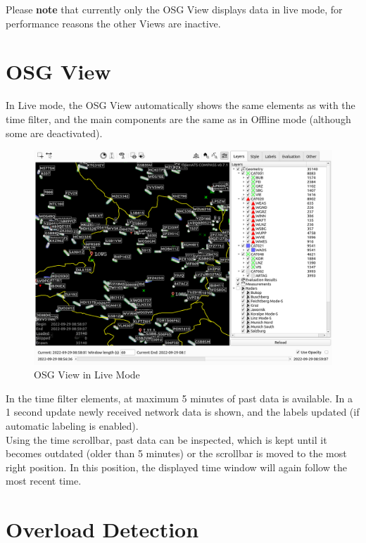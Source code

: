 Please \textbf{note} that currently only the OSG View displays data in live mode, for performance reasons the other Views are inactive.

\section{OSG View}

In Live mode, the OSG View automatically shows the same elements as with the time filter, and the main components are the same as in Offline mode (although some are deactivated).

\begin{figure}[H]
    \hspace*{-2.5cm}
    \includegraphics[width=19cm,frame]{figures/osg_live_mode.png}
  \caption{OSG View in Live Mode}
\end{figure} 

In the time filter elements, at maximum 5 minutes of past data is available. In a 1 second update newly received network data is shown, and the labels updated (if automatic labeling is enabled). \\

Using the time scrollbar, past data can be inspected, which is kept until it becomes outdated (older than 5 minutes) or the scrollbar is moved to the most right position. In this position, the displayed time window will again follow the most recent time.


\section{Overload Detection}

